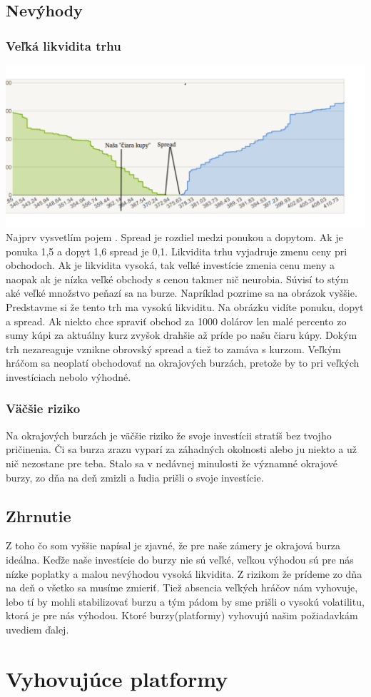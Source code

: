\subsection{Nevýhody}
\subsubsection{Veľká likvidita trhu}
\includegraphics[width=1\textwidth]{stamp}
Najprv vysvetlím pojem \cite{ZAC}. Spread je rozdiel medzi ponukou a dopytom. Ak je ponuka 1,5 a dopyt 1,6 spread je 0,1. Likvidita trhu vyjadruje zmenu ceny pri obchodoch. Ak je likvidita vysoká, tak veľké investície zmenia cenu meny a naopak ak je nízka veľké obchody s cenou takmer nič neurobia. Súvisí to stým aké veľké množstvo peňazí sa  na burze. Napríklad pozrime sa na obrázok vyššie. Predstavme si že tento trh ma vysokú likviditu. Na obrázku vidíte ponuku, dopyt a spread. 
Ak niekto chce spraviť obchod za 1000 dolárov len malé percento zo sumy kúpi za aktuálny kurz zvyšok drahšie až príde po našu čiaru kúpy. Dokým trh nezareaguje vznikne obrovský spread a tiež to zamáva s kurzom. Veľkým hráčom sa neoplatí obchodovať na okrajových burzách, pretože by to pri veľkých investíciach nebolo výhodné.
\subsubsection{Väčšie riziko}
Na okrajových burzách je väčšie riziko že svoje investícii stratíš bez tvojho pričinenia. Či sa burza zrazu vyparí za záhadných okolnosti alebo ju niekto  a už nič nezostane pre teba. Stalo sa v nedávnej minulosti že významné okrajové burzy, zo dňa na deň zmizli a ľudia prišli o svoje investície.  
\subsection{Zhrnutie}
Z toho čo som vyššie napísal je zjavné,  že pre naše zámery je okrajová burza ideálna. Keďže naše investície do burzy nie sú veľké, veľkou výhodou sú pre nás nízke poplatky a malou nevýhodou vysoká likvidita. Z rizikom že prídeme zo dňa na deň o všetko sa musíme zmieriť. Tiež absencia veľkých hráčov nám vyhovuje, lebo tí by mohli stabilizovať burzu a tým pádom by sme prišli o vysokú volatilitu, ktorá je pre nás výhodou. Ktoré burzy(platformy) vyhovujú našim požiadavkám uvediem ďalej.
\section{Vyhovujúce platformy}

